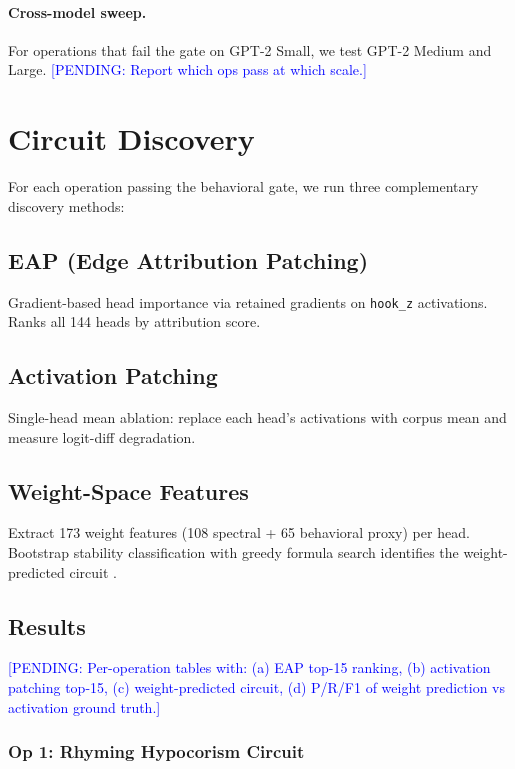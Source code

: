 \documentclass[11pt,a4paper]{article}
\newcommand{\PENDING}[1]{\textcolor{blue}{[PENDING: #1]}}
\begin{document}
\paragraph{Cross-model sweep.}
For operations that fail the gate on GPT-2 Small, we test GPT-2 Medium and
Large. \PENDING{Report which ops pass at which scale.}

\section{Circuit Discovery}

For each operation passing the behavioral gate, we run three complementary
discovery methods:

\subsection{EAP (Edge Attribution Patching)}

Gradient-based head importance via retained gradients on \texttt{hook\_z}
activations. Ranks all 144 heads by attribution score.

\subsection{Activation Patching}

Single-head mean ablation: replace each head's activations with corpus mean
and measure logit-diff degradation.

\subsection{Weight-Space Features}

Extract 173 weight features (108 spectral + 65 behavioral proxy) per head.
Bootstrap stability classification with greedy formula search identifies the
weight-predicted circuit \citep{tower2026weights}.

\subsection{Results}

\PENDING{Per-operation tables with: (a) EAP top-15 ranking, (b) activation
patching top-15, (c) weight-predicted circuit, (d) P/R/F1 of weight prediction
vs activation ground truth.}

\subsubsection{Op 1: Rhyming Hypocorism Circuit}
\end{document}
